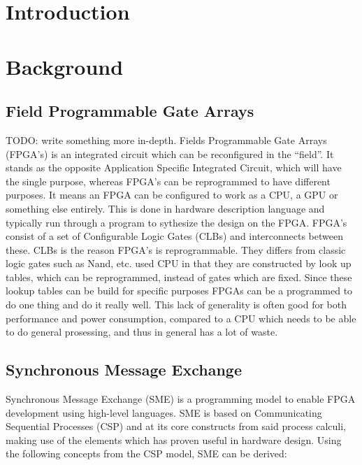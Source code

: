 \documentclass[a4paper]{article}
\date{}
\title{}
\begin{document}
\maketitle
\tableofcontents
\newpage
\section{Introduction}
\label{sec:org19dae89}

\section{Background}
\label{sec:orga037939}

\subsection{Field Programmable Gate Arrays}
\label{sec:org081eee0}
TODO: write something more in-depth.
Fields Programmable Gate Arrays (FPGA's) is an integrated circuit which can be reconfigured in the ``field''. It stands as the opposite Application Specific Integrated Circuit, which will have the single purpose, whereas FPGA's can be reprogrammed to have different purposes. It means an FPGA can be configured to work as a CPU, a GPU or something else entirely. This is done in hardware description language and typically run through a program to sythesize the design on the FPGA.
FPGA's consist of a set of Configurable Logic Gates (CLBs) and interconnects between these. CLBs is the reason FPGA's is reprogrammable. They differs from classic logic gates such as Nand, etc. used CPU in that they are constructed by look up tables, which can be reprogrammed, instead of gates which are fixed. Since these lookup tables can be build for specific purposes FPGAs can be a programmed to do one thing and do it really well. This lack of generality is often good for both performance and power consumption, compared to a CPU which needs to be able to do general prosessing, and thus in general has a lot of waste.

\subsection{Synchronous Message Exchange}
\label{SME}
Synchronous Message Exchange (SME) is a programming model to enable FPGA development using high-level languages. SME is based on Communicating Sequential Processes (CSP) and at its core constructs from said process calculi, making use of the elements which has proven useful in hardware design\cite{sme}. Using the following concepts from the CSP model\cite{CSP}, SME can be derived:
\end{document}
